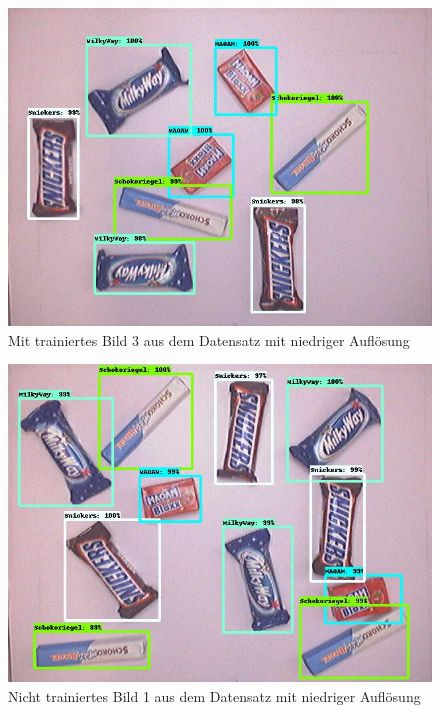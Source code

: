     \begin{figure}[H]
        \centering
        \includegraphics[angle = 90, width = \textwidth]{Bilder/models/model_comparison/ssd_resnet101_v1_fpn_640x640_coco17_tpu-8/trained_3.jpg}
        \caption{Mit trainiertes Bild 3 aus dem Datensatz mit niedriger Auflösung}
    \end{figure}
    
    \begin{figure}[H]
        \centering
        \includegraphics[angle = 90, width = \textwidth]{Bilder/models/model_comparison/ssd_resnet101_v1_fpn_640x640_coco17_tpu-8/non_trained_1.jpg}
        \caption{Nicht trainiertes Bild 1 aus dem Datensatz mit niedriger Auflösung}
    \end{figure}
    

